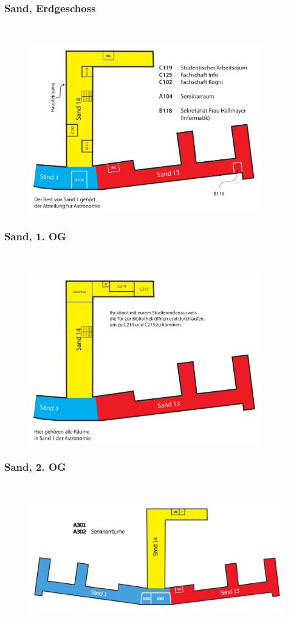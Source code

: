 \subsubsection*{Sand, Erdgeschoss}~
\begin{figure}[ht!]
	\centering
	\includegraphics[width=0.9\textwidth]{shared/anhang/lageplaene/sand_eg.pdf}
\end{figure}
\vfill 
\subsubsection*{Sand, 1. OG}~
\begin{figure}[ht!]
	\centering
	\includegraphics[width=0.9\textwidth]{shared/anhang/lageplaene/sand_1og.pdf}
\end{figure}
\subsubsection*{Sand, 2. OG}~
\begin{figure}[ht!]
	\centering
	\includegraphics[width=\textwidth]{shared/anhang/lageplaene/sand_2og.pdf}
\end{figure}